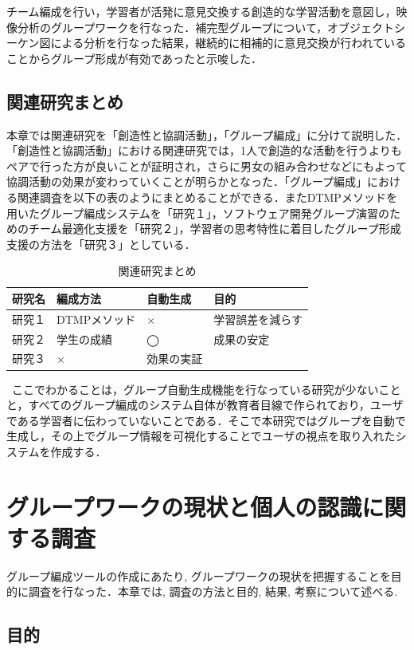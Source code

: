 \documentclass{funthesis}
\begin{document}
チーム編成を行い，学習者が活発に意見交換する創造的な学習活動を意図し，映像分析のグループワークを行なった．補完型グループについて，オブジェクトシーケン図による分析を行なった結果，継続的に相補的に意見交換が行われていることからグループ形成が有効であったと示唆した．



\section{関連研究まとめ}
本章では関連研究を「創造性と協調活動」，「グループ編成」に分けて説明した．「創造性と協調活動」における関連研究では，1人で創造的な活動を行うよりもペアで行った方が良いことが証明され，さらに男女の組み合わせなどにもよって協調活動の効果が変わっていくことが明らかとなった．「グループ編成」における関連調査を以下の表のようにまとめることができる．またDTMPメソッドを用いたグループ編成システムを「研究１」，ソフトウェア開発グループ演習のためのチーム最適化支援を「研究２」，学習者の思考特性に着目したグループ形成支援の方法を「研究３」としている．
\begin{table}[h]
\begin{center}
  \begin{tabular}{llll} \hline
    研究名 & 編成方法 & 自動生成 & 目的\tabularnewline \hline
    研究１& DTMPメソッド & × & 学習誤差を減らす\tabularnewline
    研究２&学生の成績 &◯&成果の安定\tabularnewline
    研究３&× & 効果の実証\tabularnewline
     \hline
  \end{tabular}
  \caption{関連研究まとめ}
  \label{関連まとめ}
  \end{center}
\end{table}



\ ここでわかることは，グループ自動生成機能を行なっている研究が少ないことと，すべてのグループ編成のシステム自体が教育者目線で作られており，ユーザである学習者に伝わっていないことである．そこで本研究ではグループを自動で生成し，その上でグループ情報を可視化することでユーザの視点を取り入れたシステムを作成する．
\chapter{グループワークの現状と個人の認識に関する調査}

グループ編成ツールの作成にあたり,  グループワークの現状を把握することを目的に調査を行なった．本章では,  調査の方法と目的,  結果,  考察について述べる.
\section{目的}
\end{document}
